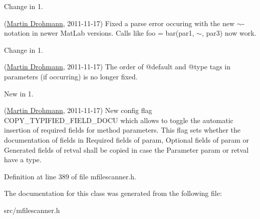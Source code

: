\begin{DoxyRefDesc}{Change in 1.}
\item[\hyperlink{changelog1_2__changelog1_2000008}{Change in 1.\+2}](\hyperlink{developers_md}{Martin Drohmann}, 2011-\/11-\/17) Fixed a parse error occuring with the new $\sim$-\/notation in newer Mat\+Lab versions. Calls like {\ttfamily foo = bar(par1, $\sim$, par3)} now work.\end{DoxyRefDesc}


\begin{DoxyRefDesc}{Change in 1.}
\item[\hyperlink{changelog1_2__changelog1_2000009}{Change in 1.\+2}](\hyperlink{developers_md}{Martin Drohmann}, 2011-\/11-\/17) The order of @default and @type tags in parameters (if occurring) is no longer fixed.\end{DoxyRefDesc}


\begin{DoxyRefDesc}{New in 1.}
\item[\hyperlink{newfeat1_2__newfeat1_2000002}{New in 1.\+2}](\hyperlink{developers_md}{Martin Drohmann}, 2011-\/11-\/17) New config flag C\+O\+P\+Y\+\_\+\+T\+Y\+P\+I\+F\+I\+E\+D\+\_\+\+F\+I\+E\+L\+D\+\_\+\+D\+O\+C\+U which allows to toggle the automatic insertion of required fields for method parameters. This flag sets whether the documentation of fields in \textquotesingle{}Required fields of param\textquotesingle{}, \textquotesingle{}Optional fields of param\textquotesingle{} or \textquotesingle{}Generated fields of retval\textquotesingle{} shall be copied in case the Parameter \textquotesingle{}param\textquotesingle{} or \textquotesingle{}retval\textquotesingle{} have a type. \end{DoxyRefDesc}


Definition at line 389 of file mfilescanner.\+h.



The documentation for this class was generated from the following file\+:\begin{DoxyCompactItemize}
\item 
src/mfilescanner.\+h\end{DoxyCompactItemize}
